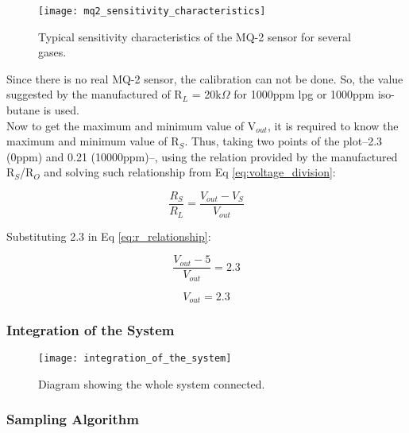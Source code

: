 \begin{figure}[ht]
    \centering\texttt{[image: mq2\_sensitivity\_characteristics]}
    \caption{Typical sensitivity characteristics of the MQ-2 sensor for several gases.}
    \label{fig:mq2_sensitivity_characteristics}
\end{figure}

Since there is no real MQ-2 sensor, the calibration can not be done. So, the value suggested by the manufactured of R$_{L}$ = 20k$\Omega$ for 1000ppm \acrshort{lpg} or 1000ppm iso-butane is used. \\

Now to get the maximum and minimum value of V$_{out}$, it is required to know the maximum and minimum value of R$_{S}$. Thus, taking two points of the plot--2.3 (0ppm) and 0.21 (10000ppm)--, using the relation provided by the manufactured R$_{S}$/R$_{O}$ and solving such relationship from Eq \ref{eq:voltage_division}: 

\begin{equation}
    \frac{R_{S}}{R_{L}} = \frac{V_{out} - V_{S}}{V_{out}}
    \label{eq:r_relationship}
\end{equation}

Substituting 2.3 in Eq \ref{eq:r_relationship}:

\begin{equation}
    \frac{V_{out} - 5}{V_{out}} = 2.3
\end{equation}

\begin{equation}
    V_{out} = 2.3
\end{equation}

\subsubsection{Integration of the System}
\label{sec:methodology:dev_methodology:iots}
\hspace{8pt}



\begin{figure}[ht]
    \centering\texttt{[image: integration\_of\_the\_system]}
    \caption{Diagram showing the whole system connected.}
    \label{fig:integration_of_the_system}
\end{figure}


\subsubsection{Sampling Algorithm}
\label{sec:methodology:dev_methodology:sa}
\hspace{8pt}


